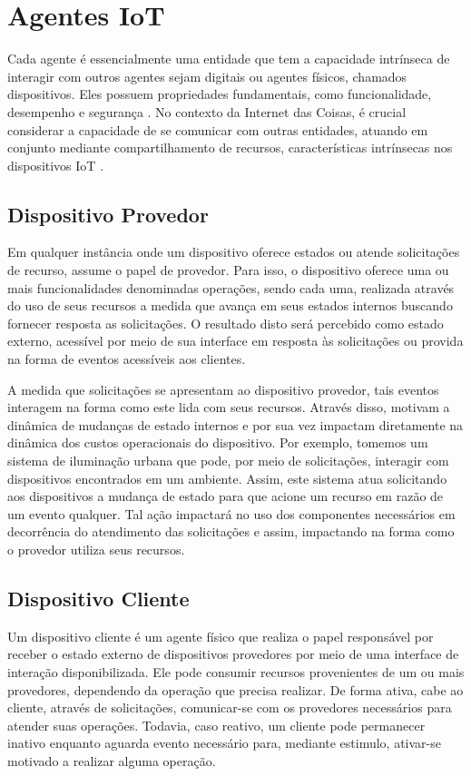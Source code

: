 \section{Agentes \acs{IoT}}
Cada agente é essencialmente uma entidade que tem a capacidade intrínseca de interagir com outros agentes sejam digitais ou agentes físicos, chamados dispositivos. Eles possuem propriedades fundamentais, como funcionalidade, desempenho e segurança \cite{avizienis_basic_2004}. No contexto da Internet das Coisas, é crucial considerar a capacidade de se comunicar com outras entidades, atuando em conjunto mediante compartilhamento de recursos, características intrínsecas nos dispositivos \acs{IoT} \cite{asghari_internet_2019}.


\subsection{Dispositivo Provedor}

Em qualquer instância onde um dispositivo oferece estados ou atende solicitações de recurso, assume o papel de provedor. Para isso, o dispositivo oferece uma ou mais funcionalidades denominadas operações, sendo cada uma, realizada através do uso de seus recursos a medida que avança em seus estados internos buscando fornecer resposta as solicitações. O resultado disto será percebido como estado externo, acessível por meio de sua interface em resposta às solicitações ou provida na forma de eventos acessíveis aos clientes. 

A medida que solicitações se apresentam ao dispositivo provedor, tais eventos interagem na forma como este lida com seus recursos. Através disso, motivam a dinâmica de mudanças de estado internos e por sua vez impactam diretamente na dinâmica dos custos operacionais do dispositivo.  Por exemplo, tomemos um sistema de iluminação urbana que pode, por meio de solicitações, interagir com dispositivos encontrados em um ambiente. Assim, este sistema atua solicitando aos dispositivos a mudança de estado para que acione um recurso em razão de um evento qualquer. Tal ação impactará no uso  dos componentes necessários em decorrência do atendimento das solicitações e assim, impactando na forma como o provedor utiliza seus recursos.


\subsection{Dispositivo Cliente}
Um dispositivo cliente é um agente físico que realiza o papel responsável por receber o estado externo de dispositivos provedores por meio de uma interface de interação disponibilizada. Ele pode consumir recursos provenientes de um ou mais provedores, dependendo da operação que precisa realizar. De forma ativa, cabe ao cliente, através de solicitações, comunicar-se com os provedores necessários para atender suas operações. Todavia, caso reativo, um cliente pode permanecer inativo enquanto aguarda evento necessário para, mediante estimulo, ativar-se motivado a realizar alguma operação. 


